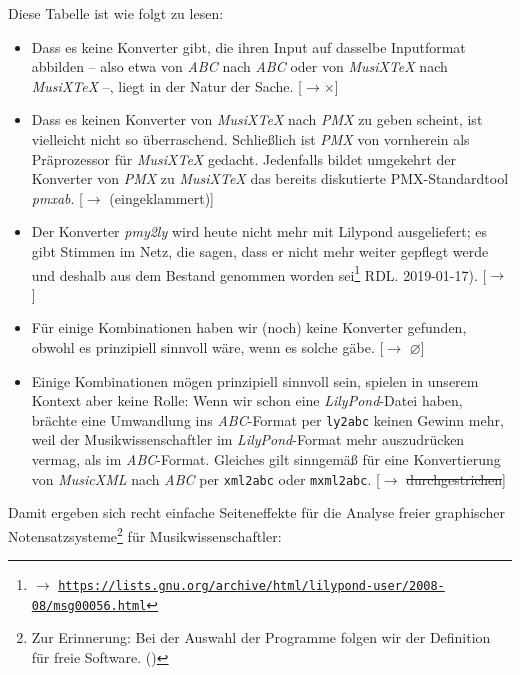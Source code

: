 Diese Tabelle ist wie folgt zu lesen:

\begin{itemize}
  \item Dass es keine Konverter gibt, die ihren Input auf dasselbe Inputformat
  abbilden -- also etwa von \textit{ABC} nach \textit{ABC} oder von \textit{MusiX\TeX}
  nach \textit{MusiX\TeX} --, liegt in der Natur der Sache. [$\rightarrow \times$]
  \item Dass es keinen Konverter von \textit{MusiX\TeX} nach \textit{PMX} zu
  geben scheint, ist vielleicht nicht so überraschend. Schließlich ist
  \textit{PMX} von vornherein als Präprozessor für \textit{MusiX\TeX} gedacht.
  Jedenfalls bildet umgekehrt der Konverter von \textit{PMX} zu \textit{MusiX\TeX} das
  bereits diskutierte PMX-Standardtool \textit{pmxab}.
  [$\rightarrow$ (eingeklammert)]
  \item Der Konverter \textit{pmy2ly} wird heute nicht mehr mit Lilypond
  ausgeliefert; es gibt Stimmen im Netz, die sagen, dass er nicht mehr weiter
  gepflegt werde und deshalb aus dem Bestand genommen worden sei\footnote{$\rightarrow$
  \href{https://lists.gnu.org/archive/html/lilypond-user/2008-08/msg00056.html}{
  \texttt{https://lists.gnu.org/archive/html/lilypond-user/2008-08/msg00056.html}}}
  RDL. 2019-01-17). [$\rightarrow$ ]
  \item Für einige Kombinationen haben wir (noch) keine Konverter gefunden, obwohl
  es prinzipiell sinnvoll wäre, wenn es solche gäbe. [$\rightarrow$ $\varnothing$]
  \item Einige Kombinationen mögen prinzipiell sinnvoll sein, spielen in unserem
  Kontext aber keine Rolle: Wenn wir schon eine \textit{LilyPond}-Datei haben,
  brächte eine Umwandlung ins \textit{ABC}-Format per \texttt{ly2abc} keinen
  Gewinn mehr, weil der Musikwissenschaftler im \textit{LilyPond}-Format mehr
  auszudrücken vermag, als im \textit{ABC}-Format. Gleiches gilt sinngemäß für
  eine Konvertierung von \textit{MusicXML} nach \textit{ABC} per
  \texttt{xml2abc} oder \texttt{mxml2abc}. [$\rightarrow$ \sout{durchgestrichen}] 
\end{itemize}

Damit ergeben sich recht einfache Seiteneffekte für die Analyse freier
graphischer Notensatzsysteme\footnote{Zur Erinnerung: Bei der Auswahl der
Programme folgen wir der Definition für freie Software. (\cite[Vgl.
dazu][\nopage wp]{FSF2018a})} für Musikwissenschaftler:

